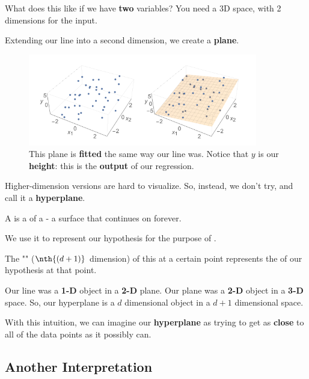         What does this like if we have \textbf{two} variables? You need a 3D space, with 2 dimensions for the input.
        
        Extending our line into a second dimension, we create a \textbf{plane}.
        
        \begin{figure}[H]
        \centering
            \includegraphics[width=100mm,scale=0.5]{images/regression_images/Regression_Plane.png}
        
            \caption*{This plane is \textbf{fitted} the same way our line was. Notice that $y$ is our \textbf{height}: this is the \textbf{output} of our regression.}
        \end{figure}
        
        Higher-dimension versions are hard to visualize. So, instead, we don't try, and call it a \textbf{hyperplane}.\\
        
        \begin{definition}
            A  is a  of a  - a  surface that continues on forever.
            
            We use it to represent our  hypothesis for the purpose of . 
            
            The "" ($\nth{(d+1)}$ dimension) of this  at a certain point represents the  of our  hypothesis at that point.
        \end{definition}
        
        Our line was a \textbf{1-D} object in a \textbf{2-D} plane. Our plane was a \textbf{2-D} object in a \textbf{3-D} space. So, our hyperplane is a $d$ dimensional object in a $d+1$ dimensional space.
        
        With this intuition, we can imagine our \textbf{hyperplane} as trying to get as \textbf{close} to all of the data points as it possibly can.
        
    \subsection{Another Interpretation}
    
